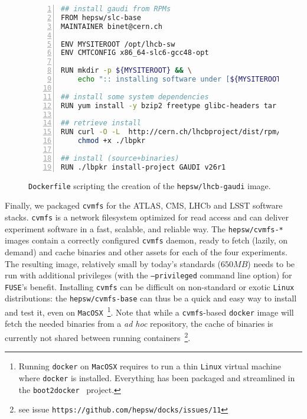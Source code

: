 \documentclass[a4paper]{jpconf}
\begin{document}
\begin{figure}[h]
	\begin{lstlisting}[language=sh,
		basicstyle=\tiny,
		frame=trbl,
		numbers=left,
		showstringspaces=false,
	stringstyle=\ttfamily]
## install gaudi from RPMs
FROM hepsw/slc-base
MAINTAINER binet@cern.ch

ENV MYSITEROOT /opt/lhcb-sw
ENV CMTCONFIG x86_64-slc6-gcc48-opt

RUN mkdir -p ${MYSITEROOT} && \
    echo ":: installing software under [${MYSITEROOT}]..."

## install some system dependencies
RUN yum install -y bzip2 freetype glibc-headers tar which

## retrieve install
RUN curl -O -L  http://cern.ch/lhcbproject/dist/rpm/lbpkr && \
    chmod +x ./lbpkr

## install (source+binaries)
RUN ./lbpkr install-project GAUDI v26r1

\end{lstlisting}
\caption{\label{fig-docker-dockerfile-lhcb}\texttt{Dockerfile}
	scripting the creation of the \texttt{hepsw/lhcb-gaudi} image.}
\end{figure}


Finally, we packaged \texttt{cvmfs} for the ATLAS, CMS, LHCb and LSST software
stacks.
\texttt{cvmfs} is a network filesystem optimized for read access and can deliver
experiment software in a fast, scalable, and reliable way.
The \texttt{hepsw/cvmfs-*} images contain a correctly configured
\texttt{cvmfs} daemon, ready to fetch (lazily, on demand) and
cache binaries and other assets for each of the four experiments.
The resulting image, relatively small by today's standards ($650 MB$) needs to
be run with additional privileges (with the \texttt{--privileged} command line
option) for \texttt{FUSE}'s benefit.
Installing \texttt{cvmfs} can be difficult on non-standard or exotic
\texttt{Linux} distributions: the \texttt{hepsw/cvmfs-base} can thus be a quick
and easy way to install and test it, even on \texttt{MacOSX}~\footnote{Running
	\texttt{docker} on \texttt{MacOSX} requires to run a thin \texttt{Linux}
	virtual machine where \texttt{docker} is installed.
	Everything has been packaged and streamlined in the
\texttt{boot2docker}~\cite{ref-boot2docker} project.}.
Note that while a \texttt{cvmfs}-based \texttt{docker} image will fetch the
needed binaries from a \emph{ad hoc} repository, the cache of binaries is
currently not shared between running containers~\footnote{see issue
\texttt{https://github.com/hepsw/docks/issues/11}}.
\end{document}
